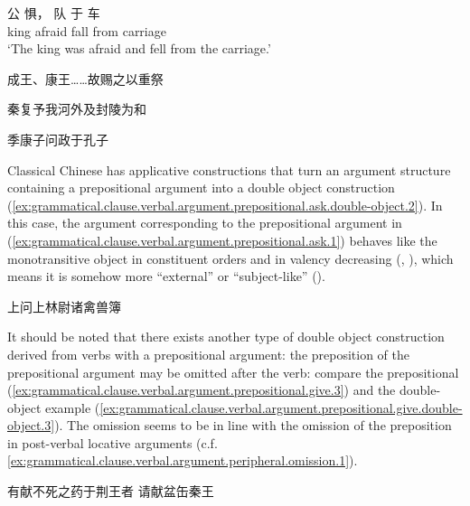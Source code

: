 \documentclass[UTF8, a4paper, oneside, scheme=plain, 12pt]{ctexrep}
\newcommand{\translate}[1]{`#1'}
\begin{document}
\begin{exe}
    \ex\label{ex:grammatical.clause.verbal.argument.prepositional.1} 
    \gll 公 惧， 队 于 车 \\
    king afraid fall from carriage \\
    \glt\translate{The king was afraid and fell from the carriage.}

    \ex\label{ex:grammatical.clause.verbal.argument.prepositional.give.1}  成王、康王……故赐之以重祭

    \ex\label{ex:grammatical.clause.verbal.argument.prepositional.give.2} 秦复予我河外及封陵为和

    \ex\label{ex:grammatical.clause.verbal.argument.prepositional.ask.1} 季康子问政于孔子
\end{exe}

Classical Chinese has applicative constructions that
turn an argument structure containing a prepositional argument into a double object construction
(\ref{ex:grammatical.clause.verbal.argument.prepositional.ask.double-object.2}).
In this case, the argument corresponding to the prepositional argument in (\ref{ex:grammatical.clause.verbal.argument.prepositional.ask.1})
behaves like the monotransitive object in constituent orders and in valency decreasing
(, ),
which means it is somehow more ``external'' or ``subject-like'' ().

\begin{exe}
    \ex\label{ex:grammatical.clause.verbal.argument.prepositional.ask.double-object.2} 上问上林尉诸禽兽簿
\end{exe}

It should be noted that there exists another type of double object construction
derived from verbs with a prepositional argument:
the preposition of the prepositional argument may be omitted after the verb:
compare the prepositional (\ref{ex:grammatical.clause.verbal.argument.prepositional.give.3})
and the double-object example (\ref{ex:grammatical.clause.verbal.argument.prepositional.give.double-object.3}).
The omission seems to be in line with the omission of the preposition in post-verbal locative arguments (c.f. \ref{ex:grammatical.clause.verbal.argument.peripheral.omission.1}).

\begin{exe}
    \ex\label{ex:grammatical.clause.verbal.argument.prepositional.give.3} 有献不死之药于荆王者
    \ex\label{ex:grammatical.clause.verbal.argument.prepositional.give.double-object.3}  请献盆缶秦王 
\end{exe}
\end{document}
